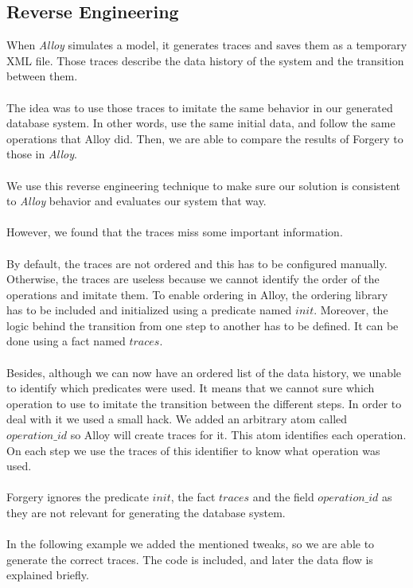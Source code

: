 \documentclass[oneside]{book}
\begin{document}
\subsection{Reverse Engineering}
When \textit{Alloy} simulates a model, it generates traces and saves them as a temporary XML file. Those traces describe the data history of the system and the transition between them.\\\\
The idea was to use those traces to imitate the same behavior in our generated database system. In other words, use the same initial data, and follow the same operations that Alloy did. Then, we are able to compare the results of Forgery to those in \textit{Alloy}.\\\\
We use this reverse engineering technique to make sure our solution is consistent to \textit{Alloy} behavior and evaluates our system that way.\\\\
However, we found that the traces miss some important information.\\\\
By default, the traces are not ordered and this has to be configured manually. Otherwise, the traces are useless because we cannot identify the order of the operations and imitate them. To enable ordering in Alloy, the ordering library has to be included and initialized using a predicate named $init$. Moreover, the logic behind the transition from one step to another has to be defined. It can be done using a fact named $traces$.\\\\
Besides, although we can now have an ordered list of the data history, we unable to identify which predicates were used. It means that we cannot sure which operation to use to imitate the transition between the different steps. In order to deal with it we used a small hack. We added an arbitrary atom called $operation\_id$ so Alloy will create traces for it. This atom identifies each operation. On each step we use the traces of this identifier to know what operation was used.\\\\
Forgery ignores the predicate $init$, the fact $traces$ and the field $operation\_id$ as they are not relevant for generating the database system.\\\\
In the following example we added the mentioned tweaks, so we are able to generate the correct traces. The code is included, and later the data flow is explained briefly.\\
\end{document}
